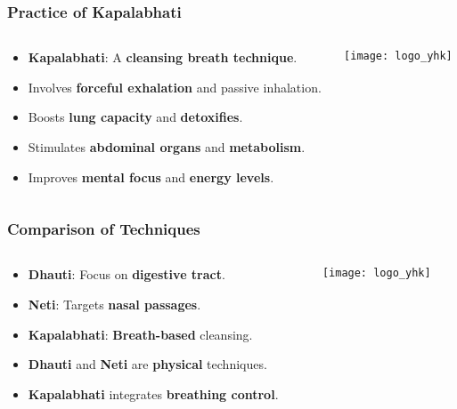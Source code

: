 \begin{frame}[fragile]\frametitle{Practice of Kapalabhati}
\begin{columns}
    \begin{column}[T]{0.5\linewidth}
      \begin{itemize}
        \item \textbf{Kapalabhati}: A \textbf{cleansing breath technique}.
        \item Involves \textbf{forceful exhalation} and passive inhalation.
        \item Boosts \textbf{lung capacity} and \textbf{detoxifies}.
        \item Stimulates \textbf{abdominal organs} and \textbf{metabolism}.
        \item Improves \textbf{mental focus} and \textbf{energy levels}.
      \end{itemize}
    \end{column}
    \begin{column}[T]{0.5\linewidth}
        \begin{center}
        \texttt{[image: logo\_yhk]}
        \end{center}	
    \end{column}
\end{columns}
\end{frame}

\begin{frame}[fragile]\frametitle{Comparison of Techniques}
\begin{columns}
    \begin{column}[T]{0.5\linewidth}
      \begin{itemize}
        \item \textbf{Dhauti}: Focus on \textbf{digestive tract}.
        \item \textbf{Neti}: Targets \textbf{nasal passages}.
        \item \textbf{Kapalabhati}: \textbf{Breath-based} cleansing.
        \item \textbf{Dhauti} and \textbf{Neti} are \textbf{physical} techniques.
        \item \textbf{Kapalabhati} integrates \textbf{breathing control}.
      \end{itemize}
    \end{column}
    \begin{column}[T]{0.5\linewidth}
        \begin{center}
        \texttt{[image: logo\_yhk]}
        \end{center}	
    \end{column}
\end{columns}
\end{frame}


